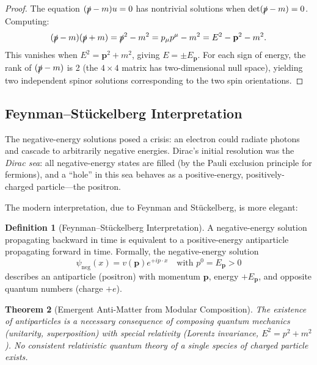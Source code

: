\documentclass[12pt]{article}
\newtheorem{theorem}{Theorem}[section]
\theoremstyle{definition}
\newtheorem{definition}[theorem]{Definition}
\theoremstyle{remark}
\begin{document}
\begin{proof}
The equation $(\slashed{p} - m)u = 0$ has nontrivial solutions when
$\det(\slashed{p} - m) = 0$. Computing:
\begin{equation}
(\slashed{p} - m)(\slashed{p} + m) = \slashed{p}^2 - m^2 = p_\mu p^\mu - m^2 = E^2 - \mathbf{p}^2 - m^2.
\end{equation}
This vanishes when $E^2 = \mathbf{p}^2 + m^2$, giving $E = \pm E_{\mathbf{p}}$.
For each sign of energy, the rank of $(\slashed{p} - m)$ is 2 (the $4 \times 4$
matrix has two-dimensional null space), yielding two independent spinor solutions
corresponding to the two spin orientations.
\end{proof}

\subsection{Feynman--St\"uckelberg Interpretation}

The negative-energy solutions posed a crisis: an electron could radiate photons and
cascade to arbitrarily negative energies. Dirac's initial resolution was the
\emph{Dirac sea}: all negative-energy states are filled (by the Pauli exclusion principle
for fermions), and a ``hole'' in this sea behaves as a positive-energy, positively-charged
particle---the positron.

The modern interpretation, due to Feynman and St\"uckelberg, is more elegant:

\begin{definition}[Feynman--St\"uckelberg Interpretation]
A negative-energy solution propagating backward in time is equivalent to a
positive-energy antiparticle propagating forward in time. Formally, the
negative-energy solution
\begin{equation}
\psi_{\text{neg}}(x) = v(\mathbf{p}) e^{+i p \cdot x} \quad \text{with } p^0 = E_{\mathbf{p}} > 0
\end{equation}
describes an antiparticle (positron) with momentum $\mathbf{p}$, energy $+E_{\mathbf{p}}$,
and opposite quantum numbers (charge $+e$).
\end{definition}

\begin{theorem}[Emergent Anti-Matter from Modular Composition]
\label{thm:emergent_antimatter}
The existence of antiparticles is a necessary consequence of composing quantum
mechanics (unitarity, superposition) with special relativity (Lorentz invariance,
$E^2 = p^2 + m^2$). No consistent relativistic quantum theory of a single species
of charged particle exists.
\end{theorem}
\end{document}
